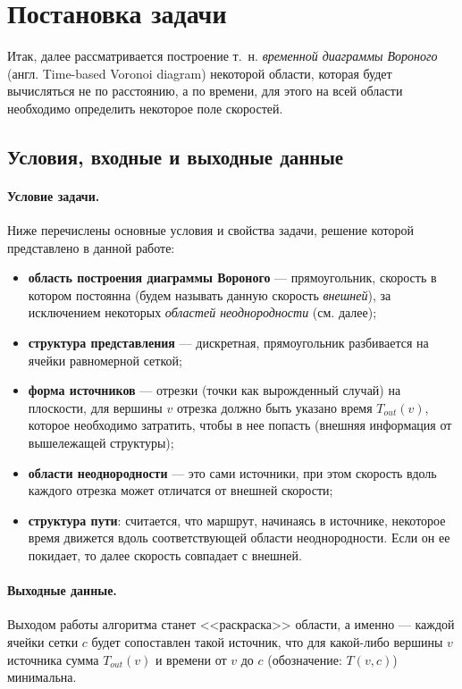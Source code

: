 \documentclass[12pt]{article}
\begin{document}
\section{Постановка задачи}
\label{task}
Итак, далее рассматривается построение т.~н. \emph{временной диаграммы Вороного}
(англ. Time-based Voronoi diagram) некоторой области, которая будет 
вычисляться не по расстоянию, а по времени, для этого на всей области
необходимо определить некоторое поле скоростей.

\subsection{Условия, входные и выходные данные}
\label{props}

\paragraph{Условие задачи.} Ниже перечислены
основные условия и свойства задачи, решение которой представлено в данной работе:
\begin{itemize}
\item \textbf{область построения диаграммы Вороного} --- прямоугольник, 
скорость в котором постоянна (будем называть данную скорость \emph{внешней}), за 
исключением некоторых \emph{областей неоднородности} (см. далее);
\item \textbf{структура представления} --- дискретная, прямоугольник разбивается на 
ячейки равномерной сеткой;
\item \textbf{форма источников} --- отрезки (точки как вырожденный случай)
на плоскости, для вершины $v$ отрезка должно быть указано время $T_{out}(v)$, 
которое необходимо  затратить, 
чтобы в нее попасть (внешняя информация от вышележащей структуры);
\item \textbf{области неоднородности} --- это сами источники, 
при этом скорость вдоль каждого отрезка может отличатся от
внешней скорости;
\item \textbf{структура пути}: считается, что маршрут, начинаясь в источнике,
некоторое время движется вдоль соответствующей области неоднородности.
Если он ее покидает, то далее скорость совпадает с внешней.
\end{itemize}

\paragraph{Выходные данные.}
Выходом работы алгоритма станет <<раскраска>> области, 
а именно --- каждой ячейки сетки $c$ будет сопоставлен такой источник, 
что для какой-либо вершины $v$ источника сумма $T_{out}(v)$ и времени от 
$v$ до $c$ (обозначение: $T(v, c)$) минимальна.
\end{document}

